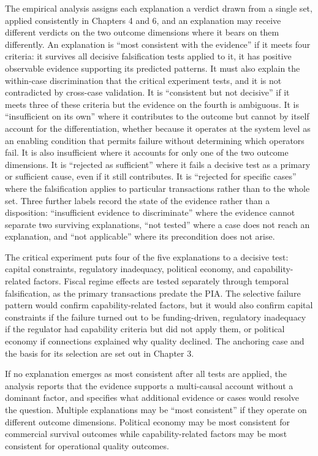 The empirical analysis assigns each explanation a verdict drawn from a
single set, applied consistently in Chapters 4 and 6, and an explanation
may receive different verdicts on the two outcome dimensions where it
bears on them differently. An explanation is ``most consistent with the
evidence'' if it meets four criteria: it survives all decisive
falsification tests applied to it, it has positive observable evidence
supporting its predicted patterns. It must also explain the within-case
discrimination that the critical experiment tests, and it is not
contradicted by cross-case validation. It is ``consistent but not
decisive'' if it meets three of these criteria but the evidence on the
fourth is ambiguous. It is ``insufficient on its own'' where it
contributes to the outcome but cannot by itself account for the
differentiation, whether because it operates at the system level as an
enabling condition that permits failure without determining which
operators fail. It is also insufficient where it accounts for only one
of the two outcome dimensions. It is ``rejected as sufficient'' where it
fails a decisive test as a primary or sufficient cause, even if it still
contributes. It is ``rejected for specific cases'' where the
falsification applies to particular transactions rather than to the
whole set. Three further labels record the state of the evidence rather
than a disposition: ``insufficient evidence to discriminate'' where the
evidence cannot separate two surviving explanations, ``not tested''
where a case does not reach an explanation, and ``not applicable'' where
its precondition does not arise.

The critical experiment puts four of the five explanations to a decisive
test: capital constraints, regulatory inadequacy, political economy, and
capability-related factors. Fiscal regime effects are tested separately
through temporal falsification, as the primary transactions predate the
PIA. The selective failure pattern would confirm capability-related
factors, but it would also confirm capital constraints if the failure
turned out to be funding-driven, regulatory inadequacy if the regulator
had capability criteria but did not apply them, or political economy if
connections explained why quality declined. The anchoring case and the
basis for its selection are set out in Chapter 3.

If no explanation emerges as most consistent after all tests are
applied, the analysis reports that the evidence supports a multi-causal
account without a dominant factor, and specifies what additional
evidence or cases would resolve the question. Multiple explanations may
be ``most consistent'' if they operate on different outcome dimensions.
Political economy may be most consistent for commercial survival
outcomes while capability-related factors may be most consistent for
operational quality outcomes.

